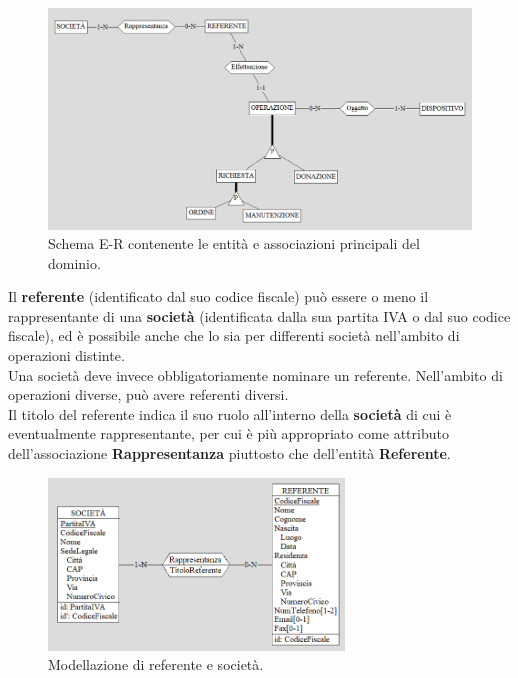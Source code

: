 \documentclass[a4paper,12pt]{report}
\begin{document}
\begin{figure}[H]
	\centering
	\includegraphics[width=\textwidth]{images/schema-scheletro.png}
	\caption{Schema E-R contenente le entità e associazioni principali del dominio.}
	\label{images:schema-scheletro}
\end{figure}

\noindent Il \textbf{referente} (identificato dal suo codice fiscale) può essere o meno il rappresentante di una \textbf{società} (identificata dalla sua partita IVA o dal suo codice fiscale), ed è possibile anche che lo sia per differenti società nell'ambito di operazioni distinte. \\
Una società deve invece obbligatoriamente nominare un referente. Nell'ambito di operazioni diverse, può avere referenti diversi. \\
Il titolo del referente indica il suo ruolo all'interno della \textbf{società} di cui è eventualmente rappresentante, per cui è più appropriato come attributo dell'associazione \textbf{Rappresentanza} piuttosto che dell'entità \textbf{Referente}.

\begin{figure}[H]
	\centering
	\includegraphics[width=0.7\textwidth]{images/referente.png}
    \caption{Modellazione di referente e società.}
	\label{images:referente}
\end{figure}
\end{document}

